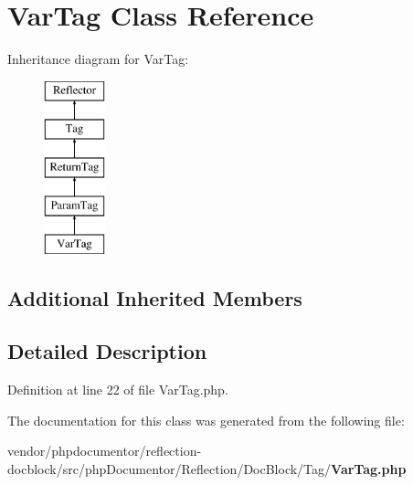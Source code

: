 \section{Var\+Tag Class Reference}
\label{classphp_documentor_1_1_reflection_1_1_doc_block_1_1_tag_1_1_var_tag}
Inheritance diagram for Var\+Tag\+:\begin{figure}[H]
\begin{center}
\leavevmode
\includegraphics[height=5.000000cm]{classphp_documentor_1_1_reflection_1_1_doc_block_1_1_tag_1_1_var_tag}
\end{center}
\end{figure}
\subsection*{Additional Inherited Members}


\subsection{Detailed Description}


Definition at line 22 of file Var\+Tag.\+php.



The documentation for this class was generated from the following file\+:\begin{DoxyCompactItemize}
\item 
vendor/phpdocumentor/reflection-\/docblock/src/php\+Documentor/\+Reflection/\+Doc\+Block/\+Tag/{\bf Var\+Tag.\+php}\end{DoxyCompactItemize}
